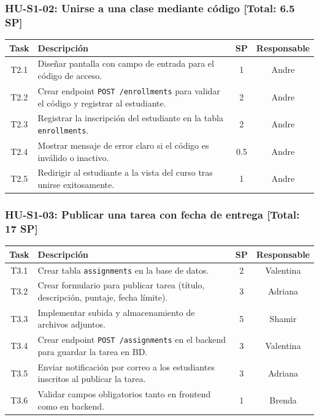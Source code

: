 \documentclass[12pt,a4paper]{article}
\renewcommand{\arraystretch}{1.45}
\begin{document}
\subsubsection*{HU-S1-02: Unirse a una clase mediante código \hfill \textnormal{[Total: 6.5 SP]}}

\begin{table}[H]
\centering
\renewcommand{\arraystretch}{1.2}
\begin{tabular}{|c|p{8cm}|c|c|}
\hline
\textbf{Task} & \textbf{Descripción} & \textbf{SP} & \textbf{Responsable} \\
\hline
T2.1 & Diseñar pantalla con campo de entrada para el código de acceso. & 1 & Andre \\
\hline
T2.2 & Crear endpoint \texttt{POST /enrollments} para validar el código y registrar al estudiante. & 2 & Andre \\
\hline
T2.3 & Registrar la inscripción del estudiante en la tabla \texttt{enrollments}. & 2 & Andre \\
\hline
T2.4 & Mostrar mensaje de error claro si el código es inválido o inactivo. & 0.5 & Andre \\
\hline
T2.5 & Redirigir al estudiante a la vista del curso tras unirse exitosamente. & 1 & Andre \\
\hline
\end{tabular}
\end{table}

\subsubsection*{HU-S1-03: Publicar una tarea con fecha de entrega \hfill \textnormal{[Total: 17 SP]}}

\begin{table}[H]
\centering
\renewcommand{\arraystretch}{1.2}
\begin{tabular}{|c|p{8cm}|c|c|}
\hline
\textbf{Task} & \textbf{Descripción} & \textbf{SP} & \textbf{Responsable} \\
\hline
T3.1 & Crear tabla \texttt{assignments} en la base de datos. & 2 & Valentina \\
\hline
T3.2 & Crear formulario para publicar tarea (título, descripción, puntaje, fecha límite). & 3 & Adriana \\
\hline
T3.3 & Implementar subida y almacenamiento de archivos adjuntos. & 5 & Shamir \\
\hline
T3.4 & Crear endpoint \texttt{POST /assignments} en el backend para guardar la tarea en BD. & 3 & Valentina \\
\hline
T3.5 & Enviar notificación por correo a los estudiantes inscritos al publicar la tarea. & 3 & Adriana \\
\hline
T3.6 & Validar campos obligatorios tanto en frontend como en backend. & 1 & Brenda \\
\hline
\end{tabular}
\end{table}
\end{document}
